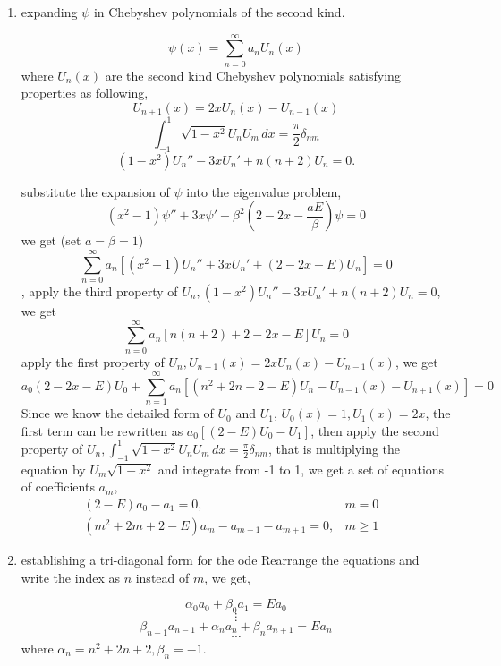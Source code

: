 \documentclass{article}
\begin{document}
\begin{enumerate}
\item expanding $\psi$ in Chebyshev polynomials of the second kind.

\[\psi(x)=\sum_{n=0}^{\infty}a_nU_n(x)\]
where $U_n(x)$ are the second kind Chebyshev polynomials satisfying properties as following,
\[U_{n+1}(x)=2xU_n(x)-U_{n-1}(x)\]
\[\int_{-1}^1\sqrt{1-x^2}U_nU_m\,dx=\frac{\pi}{2}\delta_{nm}\]
\[(1-x^2)U_n''-3xU_n'+n(n+2)U_n=0.\]

substitute the expansion of $\psi$ into the eigenvalue problem,
\[(x^2-1)\psi''+3x\psi'+\beta^2(2-2x-\frac{aE}{\beta})\psi=0\]
we get (set $a=\beta=1$)
\[\sum_{n=0}^{\infty}a_n[(x^2-1)U_n''+3xU_n'+(2-2x-E)U_n]=0\],
apply the third property of $U_n, (1-x^2)U_n''-3xU_n'+n(n+2)U_n=0$, we get
\[\sum_{n=0}^{\infty}a_n[n(n+2)+2-2x-E]U_n=0\]
apply the first property of $U_n, U_{n+1}(x)=2xU_n(x)-U_{n-1}(x)$, we get
\[a_0(2-2x-E)U_0+\sum_{n=1}^{\infty}a_n[(n^2+2n+2-E)U_n-U_{n-1}(x)-U_{n+1}(x)]=0\]
Since we know the detailed form of $U_0$ and $U_1$, $U_0(x)=1, U_1(x)=2x$, the first term can be rewritten as $a_0[(2-E)U_0-U_1]$, then apply the second property of $U_n, \int_{-1}^1\sqrt{1-x^2}U_nU_m\,dx=\frac{\pi}{2}\delta_{nm}$, that is multiplying the equation by $U_m\sqrt{1-x^2}$ and integrate from -1 to 1, we get a set of equations of coefficients $a_m$,
\begin{eqnarray*}
(2-E)a_0-a_1=0, &m=0&\\
(m^2+2m+2-E)a_m-a_{m-1}-a_{m+1}=0, &m\geq1&
\end{eqnarray*}
\item establishing a tri-diagonal form for the ode
Rearrange the equations and write the index as $n$ instead of $m$, we get,

\[\alpha_0a_0+\beta_0a_1=Ea_0\]
\[\vdots\]
\[\beta_{n-1}a_{n-1}+\alpha_na_n+\beta_na_{n+1}=Ea_n\]
\[\cdots\]
where $\alpha_n=n^2+2n+2, \beta_n=-1$.


\end{enumerate}
\end{document}

